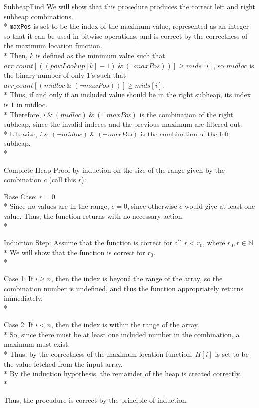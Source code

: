 \documentclass[letterpaper, reqno, 11pt]{article}
\newcommand{\NN}{\mathbb{N}}
\begin{document}
\begin{description}
	\item{SubheapFind}
	We will show that this procedure produces the correct left and right subheap combinations.\\*
	\verb|maxPos| is set to be the index of the maximum value, represented as an integer so that
	it can be used in bitwise operations, and is correct by the correctness of the maximum location
	function.\\*
	Then, $k$ is defined as the minimum value such that
	$arr\_count[((powLookup[k]-1)\ \&\ (\neg maxPos))]\geq mids[i]$,
	so $midloc$ is the binary number of only $1$'s such that
	$arr\_count[(midloc\ \&\ (\neg maxPos))]\geq mids[i]$.\\*
	Thus, if and only if an included value should be in the right subheap, its index is $1$ in midloc.\\*
	Therefore, $i\ \&\ (midloc)\ \&\ (\neg maxPos)$ is the combination of the right subheap, since the
	invalid indeces and the previous maximum are filtered out.\\*
	Likewise, $i\ \&\ (\neg midloc)\ \&\ (\neg maxPos)$ is the combination of the left subheap.\\*

	\item{Complete Heap}
	Proof by induction on the size of the range given by the combination $c$ (call this $r$):
	\begin{description}
		\item{Base Case:} $r=0$\\*
		Since no values are in the range, $c=0$, since otherwise $c$ would give at least one value.
		Thus, the function returns with no necessary action.\\*
		\item{Induction Step:} Assume that the function is correct for all $r<r_0$, where $r_0,r\in\NN$\\*
		We will show that the function is correct for $r_0$.\\*
		\begin{description}
			\item{Case 1:} If $i\geq n$, then the index is beyond the range of the array,
			so the combination number is undefined,
			and thus the function appropriately returns immediately.\\*
			\item{Case 2:} If $i<n$, then the index is within the range of the array.\\*
			So, since there must be at least one included number in the combination, a maximum
			must exist.\\*
			Thus, by the correctness of the maximum location function, $H[i]$ is set to be the value
			fetched from the input array.\\*
			By the induction hypothesis, the remainder of the heap is created correctly.\\*
		\end{description}
	\end{description}
	Thus, the procudure is correct by the principle of induction.


\end{description}
\end{document}
